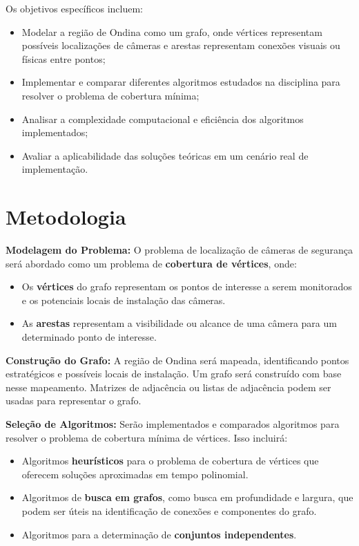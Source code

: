 \documentclass[12pt, a4paper]{report}
\begin{document}
Os objetivos específicos incluem:
\begin{itemize}
    \item Modelar a região de Ondina como um grafo, onde vértices representam possíveis localizações de câmeras e arestas representam conexões visuais ou físicas entre pontos;
    \item Implementar e comparar diferentes algoritmos estudados na disciplina para resolver o problema de cobertura mínima;
    \item Analisar a complexidade computacional e eficiência dos algoritmos implementados;
    \item Avaliar a aplicabilidade das soluções teóricas em um cenário real de implementação.
\end{itemize}

\section{Metodologia}
\textbf{Modelagem do Problema:} O problema de localização de câmeras de segurança será abordado como um problema de \textbf{cobertura de vértices}, onde:
\begin{itemize}
    \item Os \textbf{vértices} do grafo representam os pontos de interesse a serem monitorados e os potenciais locais de instalação das câmeras.
    \item As \textbf{arestas} representam a visibilidade ou alcance de uma câmera para um determinado ponto de interesse.
\end{itemize}

\textbf{Construção do Grafo:} A região de Ondina será mapeada, identificando pontos estratégicos e possíveis locais de instalação. Um grafo será construído com base nesse mapeamento. Matrizes de adjacência ou listas de adjacência podem ser usadas para representar o grafo.

\textbf{Seleção de Algoritmos:} Serão implementados e comparados algoritmos para resolver o problema de cobertura mínima de vértices. Isso incluirá:
\begin{itemize}
    \item Algoritmos \textbf{heurísticos} para o problema de cobertura de vértices que oferecem soluções aproximadas em tempo polinomial.
    \item Algoritmos de \textbf{busca em grafos}, como busca em profundidade e largura, que podem ser úteis na identificação de conexões e componentes do grafo.
    \item Algoritmos para a determinação de \textbf{conjuntos independentes}.
\end{itemize}
\end{document}
